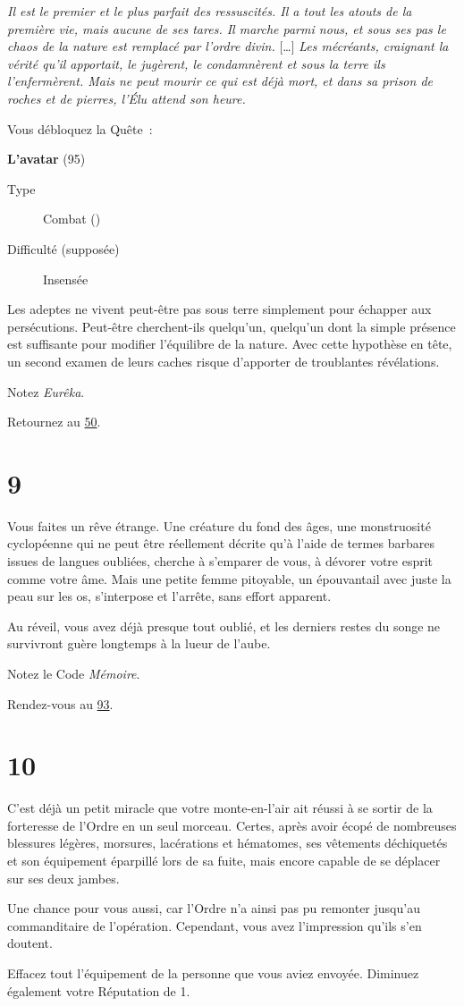 \documentclass{report}
\newcommand{\gsection}[1]{
    \section{#1}
    \label{section-#1}
}
\newcommand{\glink}[1]{\hyperref[section-#1]{#1}}
\newcommand{\quest}[5]{
    \begin{mdframed}[innertopmargin=0.5cm,innerbottommargin=0.5cm,leftmargin=0.5cm,rightmargin=0.5cm]
        \begin{center}
            \textbf{#1} (#2)
        \end{center}
        \begin{description}
            \item[Type] #3
            \item[Difficulté (supposée)] #4
        \end{description}
        #5
    \end{mdframed}
}
\begin{document}
\textit{Il est le premier et le plus parfait des ressuscités. Il a tout les atouts de la première vie, mais aucune de ses tares. Il marche parmi nous, et sous ses pas le chaos de la nature est remplacé par l'ordre divin.} [\dots] \textit{Les mécréants, craignant la vérité qu'il apportait, le jugèrent, le condamnèrent et sous la terre ils l'enfermèrent. Mais ne peut mourir ce qui est déjà mort, et dans sa prison de roches et de pierres, l'Élu attend son heure.}

Vous débloquez la Quête :

\quest{L'avatar}{95}{Combat (\ankh)}{Insensée}{
Les adeptes ne vivent peut-être pas sous terre simplement pour échapper aux persécutions. Peut-être cherchent-ils quelqu'un, quelqu'un dont la simple présence est suffisante pour modifier l'équilibre de la nature. Avec cette hypothèse en tête, un second examen de leurs caches risque d'apporter de troublantes révélations.
}

Notez \emph{Eurêka}.

Retournez au \glink{50}.

\gsection{9}

Vous faites un rêve étrange. Une créature du fond des âges, une monstruosité cyclopéenne qui ne peut être réellement décrite qu'à l'aide de termes barbares issues de langues oubliées, cherche à s'emparer de vous, à dévorer votre esprit comme votre âme. Mais une petite femme pitoyable, un épouvantail avec juste la peau sur les os, s'interpose et l'arrête, sans effort apparent.

Au réveil, vous avez déjà presque tout oublié, et les derniers restes du songe ne survivront guère longtemps à la lueur de l'aube.

Notez le Code \emph{Mémoire}.

Rendez-vous au \glink{93}.

\gsection{10}

C'est déjà un petit miracle que votre monte-en-l'air ait réussi à se sortir de la forteresse de l'Ordre en un seul morceau. Certes, après avoir écopé de nombreuses blessures légères, morsures, lacérations et hématomes, ses vêtements déchiquetés et son équipement éparpillé lors de sa fuite, mais encore capable de se déplacer sur ses deux jambes.

Une chance pour vous aussi, car l'Ordre n'a ainsi pas pu remonter jusqu'au commanditaire de l'opération. Cependant, vous avez l'impression qu'ils s'en doutent.

Effacez tout l'équipement de la personne que vous aviez envoyée. Diminuez également votre Réputation de 1.
\end{document}
